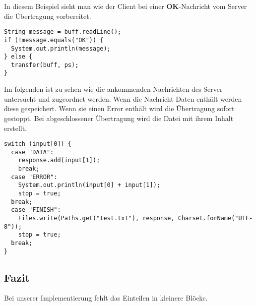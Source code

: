 In diesem Beispiel sieht man wie der Client bei einer \textbf{OK}-Nachricht vom Server die Übertragung vorbereitet.
\begin{lstlisting}
String message = buff.readLine();
if (!message.equals("OK")) {
  System.out.println(message);
} else {
  transfer(buff, ps);
}
\end{lstlisting}

Im folgenden ist zu sehen wie die ankommenden Nachrichten des Server untersucht und zugeordnet werden. Wenn die Nachricht Daten enthält werden diese gespeichert. Wenn sie einen Error enthält wird die Übertragung sofort gestoppt. Bei abgeschlossener Übertragung wird die Datei mit ihrem Inhalt erstellt.
\begin{lstlisting}
switch (input[0]) {
  case "DATA":
    response.add(input[1]);
    break;
  case "ERROR":
    System.out.println(input[0] + input[1]);
    stop = true;
  break;
  case "FINISH":
    Files.write(Paths.get("test.txt"), response, Charset.forName("UTF-8"));
    stop = true;
  break;
}
\end{lstlisting}

\subsection{Fazit}
Bei unserer Implementierung fehlt das Einteilen in kleinere Blöcke.
